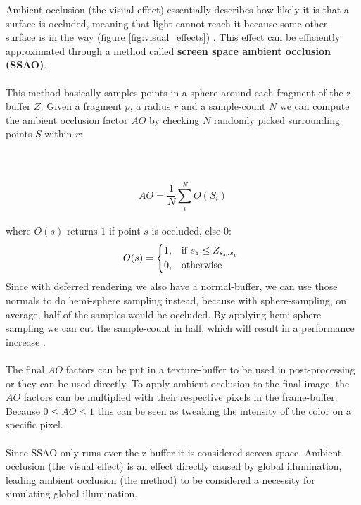 \documentclass{ACGSeminar}
\begin{document}
		Ambient occlusion (the visual effect) essentially describes how likely it is that a surface is occluded, meaning that light cannot reach it because some other surface is in the way (figure \ref{fig:visual_effects}) \cite{AOM}. This effect can be efficiently approximated through a method called \textbf{screen space ambient occlusion (SSAO)}. \\\\
		This method basically samples points in a sphere around each fragment of the z-buffer $Z$. Given a fragment $p$, a radius $r$ and a sample-count $N$ we can compute the ambient occlusion factor $AO$ by checking $N$ randomly picked surrounding points $S$ within $r$:
		\\\\\\\\
		$$ AO = \frac{1}{N} \sum_{i}^{N} O(S_i) $$%
		\\%
		where $O(s)$ returns $1$ if point $s$ is occluded, else $0$:%
		\\%
		\[
			O(s) = 
			\begin{dcases*} 
			\text{1,} & if  $s_{z} \leq Z_{s_{x}, s_{y}}$ \\ 
			\text{0,} & otherwise 
			\end{dcases*} 
		\]
		Since with deferred rendering we also have a normal-buffer, we can use those normals to do hemi-sphere sampling instead, because with sphere-sampling, on average, half of the samples would be occluded. By applying hemi-sphere sampling we can cut the sample-count in half, which will result in a performance increase \cite{AOM}. \\\\
		The final $AO$ factors can be put in a texture-buffer to be used in post-processing or they can be used directly. To apply ambient occlusion to the final image, the $AO$ factors can be multiplied with their respective pixels in the frame-buffer. Because $0 \leq AO \leq 1$ this can be seen as tweaking the intensity of the color on a specific pixel. \\\\
		Since SSAO only runs over the z-buffer it is considered screen space. Ambient occlusion (the visual effect) is an effect directly caused by global illumination, leading ambient occlusion (the method) to be considered a necessity for simulating global illumination. \\\\
\end{document}
